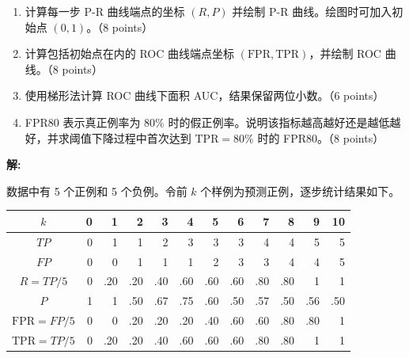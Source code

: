 \documentclass[8pt]{article}
\newcommand{\ans}{\par\noindent\textbf{\large 解:}\par}
\begin{document}
\begin{enumerate}[leftmargin=2.2em,itemsep=0.55em]
  \item 计算每一步 P-R 曲线端点的坐标 $(R,P)$ 并绘制 P-R 曲线。绘图时可加入初始点 $(0,1)$。（8 points）
  \item 计算包括初始点在内的 ROC 曲线端点坐标 $(\mathrm{FPR},\mathrm{TPR})$，并绘制 ROC 曲线。（8 points）
  \item 使用梯形法计算 ROC 曲线下面积 AUC，结果保留两位小数。（6 points）
  \item FPR80 表示真正例率为 $80\%$ 时的假正例率。说明该指标越高越好还是越低越好，并求阈值下降过程中首次达到 $\mathrm{TPR}=80\%$ 时的 FPR80。（8 points）
\end{enumerate}

\ans
数据中有 5 个正例和 5 个负例。令前 $k$ 个样例为预测正例，逐步统计结果如下。
\begin{center}
\small
\setlength{\tabcolsep}{3.8pt}
\begin{tabular}{c|rrrrrrrrrrr}
\toprule
$k$ &0&1&2&3&4&5&6&7&8&9&10\\
\midrule
$TP$&0&1&1&2&3&3&3&4&4&5&5\\
$FP$&0&0&1&1&1&2&3&3&4&4&5\\
$R=TP/5$&0&.20&.20&.40&.60&.60&.60&.80&.80&1&1\\
$P$&1&1&.50&.67&.75&.60&.50&.57&.50&.56&.50\\
$\mathrm{FPR}=FP/5$&0&0&.20&.20&.20&.40&.60&.60&.80&.80&1\\
$\mathrm{TPR}=TP/5$&0&.20&.20&.40&.60&.60&.60&.80&.80&1&1\\
\bottomrule
\end{tabular}
\end{center}
\end{document}
